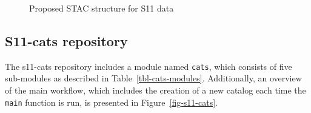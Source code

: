 \documentclass[
  oneside,
  open=any]{scrbook}
\begin{document}
\begin{figure}[H]


\caption{\label{fig-stac-str}Proposed STAC structure for S11 data}

\end{figure}%

\subsection{S11-cats repository}\label{s11-cats-repository}

The s11-cats repository includes a module named \texttt{cats}, which
consists of five sub-modules as described in
Table~\ref{tbl-cats-modules}. Additionally, an overview of the main
workflow, which includes the creation of a new catalog each time the
\texttt{main} function is run, is presented in
Figure~\ref{fig-s11-cats}.
\end{document}
